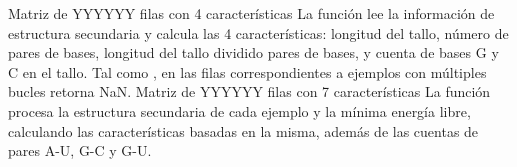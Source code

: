 %
{Matriz de YYYYYY filas con 4 características}
La función  lee la información de estructura
secundaria y calcula las 4 características: longitud del tallo, número
de pares de bases, longitud del tallo dividido pares de bases, y
cuenta de bases G y C en el tallo. Tal como , en
las filas correspondientes a ejemplos con múltiples bucles retorna
NaN.
%
{Matriz de YYYYYY filas con 7 características}
La función  procesa la estructura secundaria de
cada ejemplo y la mínima energía libre, calculando las características
basadas en la misma, además de las cuentas de pares A-U, G-C y G-U.